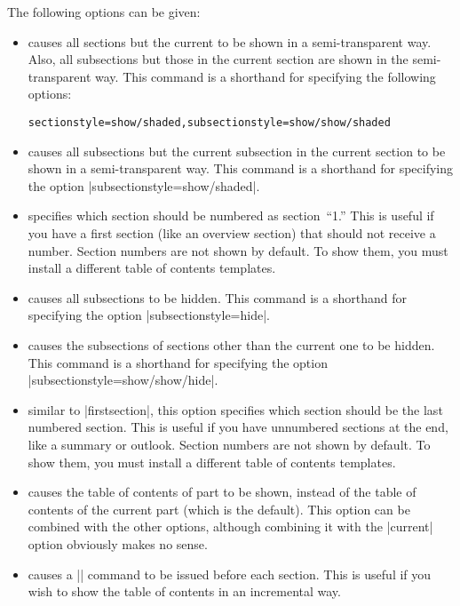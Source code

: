 \begin{command}{\tableofcontents{}}
  The following options can be given:
  \begin{itemize}
  \item
     causes all sections but the current to be shown in a semi-transparent way. Also, all subsections but those in the current section are shown in the semi-transparent way. This command is a shorthand for specifying the following options:

\begin{verbatim}
sectionstyle=show/shaded,subsectionstyle=show/show/shaded
\end{verbatim}
  \item
     causes all subsections but the current subsection in the current section to be shown in a semi-transparent way. This command is a shorthand for specifying the option |subsectionstyle=show/shaded|.
  \item
     specifies which section should be numbered as section~``1.''  This is useful if you have a first section (like an overview section) that should not receive a number. Section numbers are not shown by default. To show them, you must install a different table of contents templates.
  \item
     causes all subsections to be hidden. This command is a shorthand for specifying the option |subsectionstyle=hide|.
  \item
     causes the subsections of sections other than the current one to be hidden. This command is a shorthand for specifying the option |subsectionstyle=show/show/hide|.
  \item
     similar to |firstsection|, this option specifies which section should be the last numbered section.  This is useful if you have unnumbered sections at the end, like a summary or outlook. Section numbers are not shown by default. To show them, you must install a different table of contents templates.    
  \item
     causes the table of contents of part  to be shown, instead of the table of contents of the current part (which is the default). This option can be combined with the other options, although combining it with the |current| option obviously makes no sense.
  \item
     causes a |\pause| command to be issued before each section. This is useful if you wish to show the table of contents in an incremental way.

\end{itemize}
\end{command}
